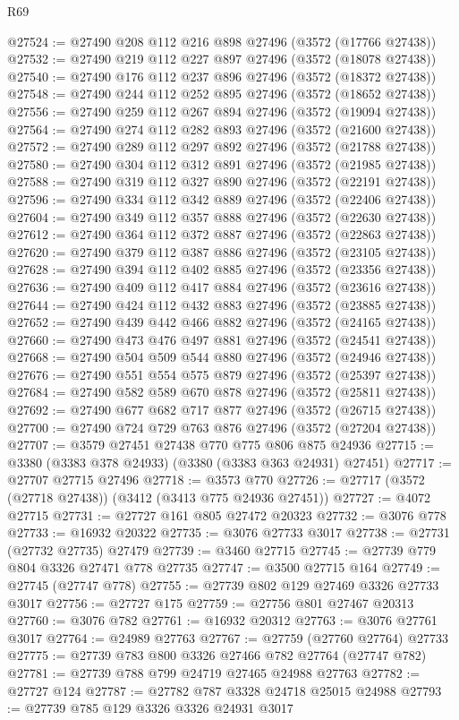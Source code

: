 \begin{lexlean}{R69}
\begin{coremodule}
@27524 := @27490 @208 @112 @216 @898 @27496 (@3572 (@17766 @27438))
@27532 := @27490 @219 @112 @227 @897 @27496 (@3572 (@18078 @27438))
@27540 := @27490 @176 @112 @237 @896 @27496 (@3572 (@18372 @27438))
@27548 := @27490 @244 @112 @252 @895 @27496 (@3572 (@18652 @27438))
@27556 := @27490 @259 @112 @267 @894 @27496 (@3572 (@19094 @27438))
@27564 := @27490 @274 @112 @282 @893 @27496 (@3572 (@21600 @27438))
@27572 := @27490 @289 @112 @297 @892 @27496 (@3572 (@21788 @27438))
@27580 := @27490 @304 @112 @312 @891 @27496 (@3572 (@21985 @27438))
@27588 := @27490 @319 @112 @327 @890 @27496 (@3572 (@22191 @27438))
@27596 := @27490 @334 @112 @342 @889 @27496 (@3572 (@22406 @27438))
@27604 := @27490 @349 @112 @357 @888 @27496 (@3572 (@22630 @27438))
@27612 := @27490 @364 @112 @372 @887 @27496 (@3572 (@22863 @27438))
@27620 := @27490 @379 @112 @387 @886 @27496 (@3572 (@23105 @27438))
@27628 := @27490 @394 @112 @402 @885 @27496 (@3572 (@23356 @27438))
@27636 := @27490 @409 @112 @417 @884 @27496 (@3572 (@23616 @27438))
@27644 := @27490 @424 @112 @432 @883 @27496 (@3572 (@23885 @27438))
@27652 := @27490 @439 @442 @466 @882 @27496 (@3572 (@24165 @27438))
@27660 := @27490 @473 @476 @497 @881 @27496 (@3572 (@24541 @27438))
@27668 := @27490 @504 @509 @544 @880 @27496 (@3572 (@24946 @27438))
@27676 := @27490 @551 @554 @575 @879 @27496 (@3572 (@25397 @27438))
@27684 := @27490 @582 @589 @670 @878 @27496 (@3572 (@25811 @27438))
@27692 := @27490 @677 @682 @717 @877 @27496 (@3572 (@26715 @27438))
@27700 := @27490 @724 @729 @763 @876 @27496 (@3572 (@27204 @27438))
@27707 := @3579 @27451 @27438 @770 @775 @806 @875 @24936
@27715 := @3380 (@3383 @378 @24933) (@3380 (@3383 @363 @24931) @27451)
@27717 := @27707 @27715 @27496
@27718 := @3573 @770
@27726 := @27717 (@3572 (@27718 @27438)) (@3412 (@3413 @775 @24936 @27451))
@27727 := @4072 @27715
@27731 := @27727 @161 @805 @27472 @20323
@27732 := @3076 @778
@27733 := @16932 @20322
@27735 := @3076 @27733 @3017
@27738 := @27731 (@27732 @27735) @27479
@27739 := @3460 @27715
@27745 := @27739 @779 @804 @3326 @27471 @778 @27735
@27747 := @3500 @27715 @164
@27749 := @27745 (@27747 @778)
@27755 := @27739 @802 @129 @27469 @3326 @27733 @3017
@27756 := @27727 @175
@27759 := @27756 @801 @27467 @20313
@27760 := @3076 @782
@27761 := @16932 @20312
@27763 := @3076 @27761 @3017
@27764 := @24989 @27763
@27767 := @27759 (@27760 @27764) @27733
@27775 := @27739 @783 @800 @3326 @27466 @782 @27764 (@27747 @782)
@27781 := @27739 @788 @799 @24719 @27465 @24988 @27763
@27782 := @27727 @124
@27787 := @27782 @787 @3328 @24718 @25015 @24988
@27793 := @27739 @785 @129 @3326 @3326 @24931 @3017

\end{coremodule}
\end{lexlean}
